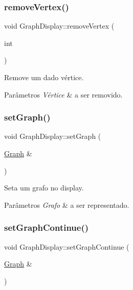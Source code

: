 \subsubsection{\texorpdfstring{remove\+Vertex()}{removeVertex()}}
{\footnotesize\ttfamily void Graph\+Display\+::remove\+Vertex (\begin{DoxyParamCaption}\item[{int}]{ }\end{DoxyParamCaption})}

Remove um dado vértice. 
\begin{DoxyParams}{Parâmetros}
{\em Vértice} & a ser removido. \\
\hline
\end{DoxyParams}
\mbox{\label{classGraphDisplay_a496ee74caea737ce5f93f9d23474eb6d}} 
\subsubsection{\texorpdfstring{set\+Graph()}{setGraph()}}
{\footnotesize\ttfamily void Graph\+Display\+::set\+Graph (\begin{DoxyParamCaption}\item[{\hyperlink{classGraph}{Graph} \&}]{ }\end{DoxyParamCaption})}

Seta um grafo no display. 
\begin{DoxyParams}{Parâmetros}
{\em Grafo} & a ser representado. \\
\hline
\end{DoxyParams}
\mbox{\label{classGraphDisplay_ab90cdfe3694a8a34767dc50268cf5a50}} 
\subsubsection{\texorpdfstring{set\+Graph\+Continue()}{setGraphContinue()}}
{\footnotesize\ttfamily void Graph\+Display\+::set\+Graph\+Continue (\begin{DoxyParamCaption}\item[{\hyperlink{classGraph}{Graph} \&}]{ }\end{DoxyParamCaption})}

